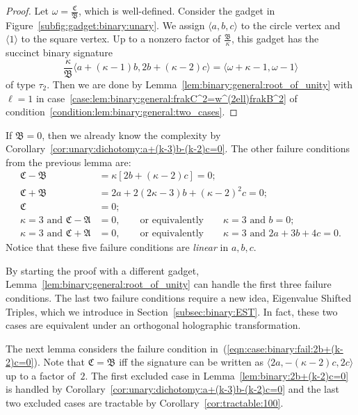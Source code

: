 \documentclass[11pt]{article}
\begin{document}
\begin{proof}
 Let $\omega = \frac{\mathfrak{C}}{\mathfrak{B}}$,
 which is well-defined.
 Consider the gadget in Figure~\ref{subfig:gadget:binary:unary}.
 We assign $\langle a,b,c \rangle$ to the circle vertex and $\langle 1 \rangle$ to the square vertex.
 Up to a nonzero factor of $\frac{\mathfrak{B}}{\kappa}$,
 this gadget has the succinct binary signature
 \[
  \frac{\kappa}{\mathfrak{B}} \langle a + (\kappa - 1) b, 2 b + (\kappa - 2) c \rangle = \langle \omega + \kappa - 1, \omega - 1 \rangle
 \]
 of type $\tau_2$.
 Then we are done by Lemma~\ref{lem:binary:general:root_of_unity} with $\ell = 1$
 in case~\ref{case:lem:binary:general:frakC^2=w^(2ell)frakB^2} of condition~\ref{condition:lem:binary:general:two_cases}.
\end{proof}

If $\mathfrak{B} = 0$,
then we already know the complexity by Corollary~\ref{cor:unary:dichotomy:a+(k-3)b-(k-2)c=0}.
The other failure conditions from the previous lemma are:
\begin{align}
 \mathfrak{C} - \mathfrak{B} &= \kappa [2 b + (\kappa - 2) c] = 0; \label{eqn:case:binary:fail:2b+(k-2)c=0}\\
 \mathfrak{C} + \mathfrak{B} &= 2 a + 2 (2 \kappa - 3) b + (\kappa - 2)^2 c = 0; \label{eqn:case:binary:fail:2a+2(2k-3)b+(k-2)^2c=0}\\
 \mathfrak{C} &= 0; \label{eqn:case:binary:fail:a+3(k-1)b+(k-2)(k-1)c=0}\\
 \kappa = 3 \text{ and } \mathfrak{C} - \mathfrak{A} &= 0, \qquad \text{or equivalently} \qquad \kappa = 3 \text{ and } b = 0; \label{eqn:case:binary:fail:k=3_and_b=0}\\
 \kappa = 3 \text{ and } \mathfrak{C} + \mathfrak{A} &= 0, \qquad \text{or equivalently} \qquad \kappa = 3 \text{ and } 2 a + 3 b + 4 c = 0. \label{eqn:case:binary:fail:k=3_and_2a+3b+4c=0}
\end{align}
Notice that these five failure conditions are \emph{linear} in $a,b,c$.

By starting the proof with a different gadget,
Lemma~\ref{lem:binary:general:root_of_unity} can handle the first three failure conditions.
The last two failure conditions require a new idea,
Eigenvalue Shifted Triples,
which we introduce in Section~\ref{subsec:binary:EST}.
In fact, these two cases are equivalent under an orthogonal holographic transformation.

The next lemma considers the failure condition in~(\ref{eqn:case:binary:fail:2b+(k-2)c=0}).
Note that $\mathfrak{C} = \mathfrak{B}$ iff the signature can be written as $\langle 2 a, -(\kappa - 2) c, 2 c \rangle$ up to a factor of~$2$.
The first excluded case in Lemma~\ref{lem:binary:2b+(k-2)c=0} is handled by Corollary~\ref{cor:unary:dichotomy:a+(k-3)b-(k-2)c=0}
and the last two excluded cases are tractable by Corollary~\ref{cor:tractable:100}.
\end{document}
